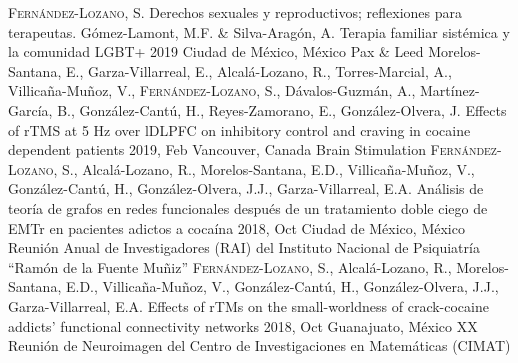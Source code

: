 {
\setlength\tabcolsep{0pt} \setlength{\extrarowheight}{0pt}%
\begin{itemize}[leftmargin=5ex, nosep, noitemsep, itemindent=-13pt,
    label=\raisebox{0.25ex}{\tiny$\bullet$}]%
    \vspace{-1.8mm}%
    \cvchapt
        {\scshape{Fernández-Lozano, S.}}
        {Derechos sexuales y reproductivos; reflexiones para terapeutas.}
        {Gómez-Lamont, M.F. \& Silva-Aragón, A.}
        {Terapia familiar sistémica y la comunidad LGBT+}
        {2019}
        {Ciudad de México, México}
        {Pax \& Leed}
    \cvposter
        {Morelos-Santana, E., Garza-Villarreal, E., Alcalá-Lozano, R.,
          Torres-Marcial, A., Villicaña-Muñoz, V., {\scshape{Fernández-Lozano,
          S.}}, Dávalos-Guzmán, A., Martínez-García, B., González-Cantú, H.,
          Reyes-Zamorano, E., González-Olvera, J.}
        {Effects of rTMS at 5 Hz over lDLPFC on inhibitory control and craving
            in cocaine dependent patients}
        {2019, Feb}
        {Vancouver, Canada}
        {Brain Stimulation}
    \cvposter
        {{\scshape{Fernández-Lozano, S.}}, Alcalá-Lozano, R., Morelos-Santana, E.D.,
            Villicaña-Muñoz, V., González-Cantú, H., González-Olvera, J.J.,
        Garza-Villarreal, E.A.}
        {Análisis de teoría de grafos en redes funcionales después de un
            tratamiento doble ciego de EMTr en pacientes adictos a cocaína}
        {2018, Oct}
        {Ciudad de México, México}
        {Reunión Anual de Investigadores (RAI) del Instituto Nacional de Psiquiatría ``Ramón de la Fuente Muñiz''}
    \cvposter
        {{\scshape{Fernández-Lozano, S.}}, Alcalá-Lozano, R., Morelos-Santana, E.D.,
            Villicaña-Muñoz, V., González-Cantú, H., González-Olvera, J.J.,
        Garza-Villarreal, E.A.}
        {Effects of rTMs on the small-worldness of crack-cocaine addicts' functional connectivity networks}
        {2018, Oct}
        {Guanajuato, México}
        {XX Reunión de Neuroimagen del Centro de Investigaciones en Matemáticas (CIMAT)}
\end{itemize}
}
